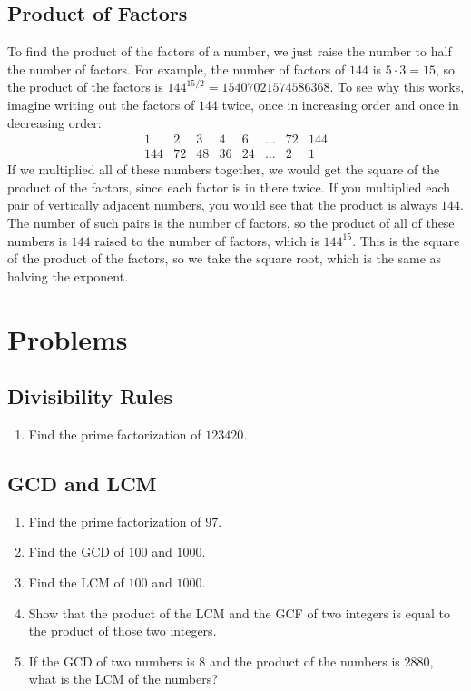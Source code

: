 \documentclass[twocolumn]{article}
\begin{document}
\subsection*{Product of Factors}
To find the product of the factors of a number, we just raise the number to half the
number of factors.
For example, the number of factors of $144$ is $5 \cdot 3 = 15$, so the product of the factors
is $144^{15 / 2} = 15407021574586368$.
To see why this works, imagine writing out the factors of $144$ twice,
once in increasing order and once in decreasing order:
\[
	\begin{array}{cccccccc}
		1   & 2  & 3  & 4  & 6  & \dots & 72 & 144 \\
		144 & 72 & 48 & 36 & 24 & \dots & 2  & 1
	\end{array}
\]
If we multiplied all of these numbers together, we would get the square of the
product of the factors, since each factor is in there twice.
If you multiplied each pair of vertically adjacent numbers, you would see that the product
is always $144$.
The number of such pairs is the number of factors, so the product of all of these numbers
is $144$ raised to the number of factors, which is $144^{15}$.
This is the square of the product of the factors, so we take the square root,
which is the same as halving the exponent.

\section*{Problems}

\subsection*{Divisibility Rules}
\begin{enumerate}
	\item Find the prime factorization of $123420$.
		\vspace{3cm}
\end{enumerate}

\subsection*{GCD and LCM}
\begin{enumerate}[resume]
	\item Find the prime factorization of $97$.
		\vspace{3cm}
	\item Find the GCD of $100$ and $1000$.
		\vspace{3cm}
	\item Find the LCM of $100$ and $1000$.
		\vspace{3cm}
	\item Show that the product of the LCM and the GCF of two integers
		is equal to the product of those two integers.
		\vspace{3cm}
	\item If the GCD of two numbers is $8$ and the product of the numbers is $2880$,
		what is the LCM of the numbers?
		\vspace{3cm}
\end{enumerate}
\end{document}

